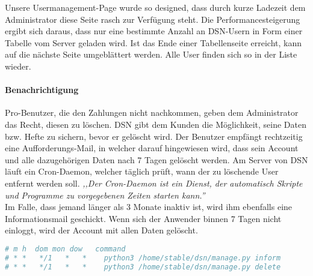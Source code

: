 Unsere Usermanagement-Page wurde so designed, dass durch kurze Ladezeit dem Administrator diese Seite rasch zur Verfügung steht. Die Performancesteigerung ergibt sich daraus, dass nur eine bestimmte Anzahl an DSN-Usern in Form einer Tabelle vom Server geladen wird. Ist das Ende einer Tabellenseite erreicht, kann auf die nächste Seite umgeblättert werden. Alle User finden sich so in der Liste wieder.

\paragraph{Benachrichtigung}
Pro-Benutzer, die den Zahlungen nicht nachkommen, geben dem Administrator das Recht, diesen zu löschen. DSN gibt dem Kunden die Möglichkeit, seine Daten bzw. Hefte zu sichern, bevor er gelöscht wird. Der Benutzer empfängt rechtzeitig eine Aufforderungs-Mail, in welcher darauf hingewiesen wird, dass sein Account und alle dazugehörigen Daten nach 7 Tagen gelöscht werden. Am Server von DSN läuft ein Cron-Daemon, welcher täglich prüft, wann der zu löschende User entfernt werden soll. \textit{,,Der Cron-Daemon ist ein Dienst, der automatisch Skripte und Programme zu vorgegebenen Zeiten starten kann.''}\cite{CRON}\\
Im Falle, dass jemand länger als 3 Monate inaktiv ist, wird ihm ebenfalls eine Informationsmail geschickt. Wenn sich der Anwender binnen 7 Tagen nicht einloggt, wird der Account mit allen Daten gelöscht. \cite{COMMANDS}\cite{CRON}

\begin{lstlisting}[caption={Cronjob für die {\"U}berpr{\"u}fung der Inaktivit{\"a}t und L{\"o}schung}, language=bash]
# m h  dom mon dow   command
# * *   */1   *   *    python3 /home/stable/dsn/manage.py inform
# * *   */1   *   *    python3 /home/stable/dsn/manage.py delete
\end{lstlisting}